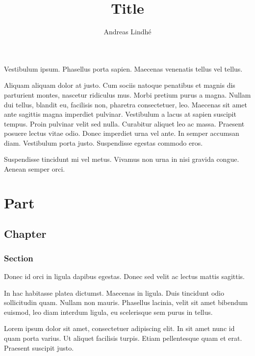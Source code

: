 \documentclass[a4paper]{report}
\title{Title}
\author{Andreas Lindhé} %
\begin{document}
\maketitle

\tableofcontents

\abstract

Vestibulum ipsum. Phasellus porta sapien. Maecenas venenatis tellus vel tellus.

Aliquam aliquam dolor at justo. Cum sociis natoque penatibus et magnis dis
parturient montes, nascetur ridiculus mus. Morbi pretium purus a magna. Nullam
dui tellus, blandit eu, facilisis non, pharetra consectetuer, leo. Maecenas sit
amet ante sagittis magna imperdiet pulvinar. Vestibulum a lacus at sapien
suscipit tempus. Proin pulvinar velit sed nulla. Curabitur aliquet leo ac massa.
Praesent posuere lectus vitae odio. Donec imperdiet urna vel ante. In semper
accumsan diam. Vestibulum porta justo. Suspendisse egestas commodo eros.

Suspendisse tincidunt mi vel metus. Vivamus non urna in nisi gravida congue.
Aenean semper orci.


\part{Part}

\chapter{Chapter}

\section{Section} %

%

Donec id orci in ligula dapibus egestas. Donec sed velit ac lectus mattis
sagittis.

In hac habitasse platea dictumst. Maecenas in ligula. Duis tincidunt odio
sollicitudin quam. Nullam non mauris. Phasellus lacinia, velit sit amet bibendum
euismod, leo diam interdum ligula, eu scelerisque sem purus in tellus.

Lorem ipsum dolor sit amet, consectetuer adipiscing elit. In sit amet nunc id
quam porta varius. Ut aliquet facilisis turpis. Etiam pellentesque quam et erat.
Praesent suscipit justo.
\end{document}
